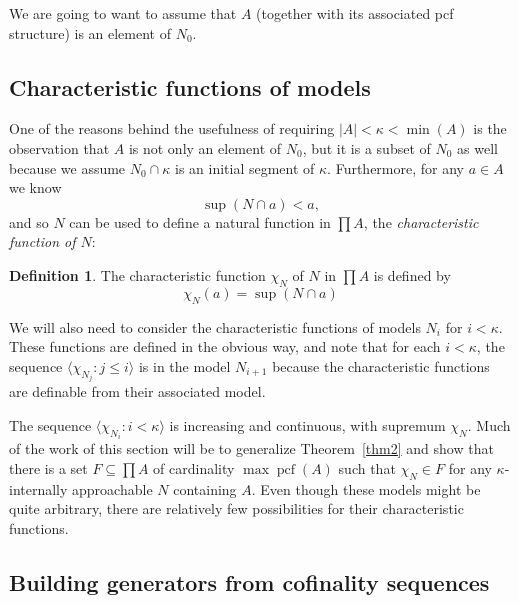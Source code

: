 \documentclass[10pt]{amsart}
\theoremstyle{plain}
\theoremstyle{definition}
\newtheorem{definition}[proposition]{Definition}
\theoremstyle{remark}
\DeclareMathOperator{\pcf}{pcf}
\numberwithin{equation}{section}
\begin{document}
We are going to want to assume that $A$ (together with its associated pcf structure) is an element of $N_0$.


\subsection{Characteristic functions of models} One of the reasons behind the usefulness of requiring $|A|<\kappa<\min(A)$ is the observation that $A$ is not only an element of $N_0$,
but it is a subset of $N_0$ as well because we assume $N_0\cap\kappa$ is an initial segment of $\kappa$.
Furthermore, for any $a\in A$ we know
\begin{equation}
\sup(N\cap a)<a,
\end{equation}
and so $N$ can be used to define a natural function in $\prod A$, the {\em characteristic function of $N$}:

\begin{definition}
The characteristic function $\chi_N$ of $N$ in $\prod A$ is defined by
\begin{equation}
\chi_N(a) = \sup(N\cap a)
\end{equation}
\end{definition}
We will also need to consider the characteristic functions of models $N_i$ for $i<\kappa$.  These functions are defined in the
obvious way, and note that for each $i<\kappa$, the sequence $\langle \chi_{N_j}:j\leq i\rangle$ is in the model $N_{i+1}$ because the characteristic functions are definable from their associated model.

The sequence $\langle \chi_{N_i}:i<\kappa\rangle$ is increasing and continuous, with supremum $\chi_N$.  Much of the work of this section will be to generalize Theorem~\ref{thm2} and show that there is a set $F\subseteq\prod A$ of cardinality $\max\pcf(A)$ such that $\chi_N\in F$ for any  $\kappa$-internally approachable $N$ containing $A$.  Even though these models might be quite arbitrary, there are relatively few possibilities for their characteristic functions.



\subsection{Building generators from cofinality sequences}
\end{document}
